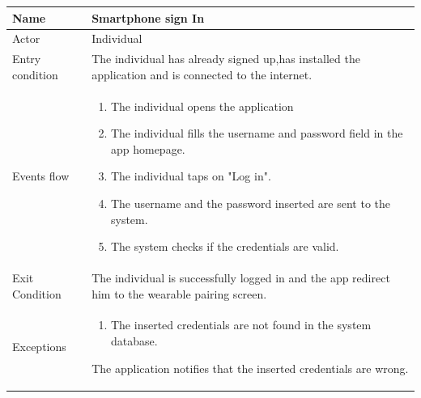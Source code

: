 \begin{tabular}{|l|p{11cm}|}
    \hline
    Name & Smartphone sign In
    \\ \hline
    Actor & Individual
    \\ \hline 
    Entry condition & The individual has already signed up,has installed the application and is connected to the internet.
    \\ \hline
    Events flow &
    \begin{enumerate}
    \item The individual opens the application
    \item The individual fills the username and password field in the app homepage.
    \item The individual taps on "Log in".
    \item The username and the password inserted are sent to the system.
    \item The system checks if the credentials are valid.
    \end{enumerate}
     \\ \hline
     Exit Condition & The individual is successfully logged in and the app redirect him to the wearable pairing screen.
     \\
    \hline
    Exceptions &
     \begin{enumerate}
    \item The inserted credentials are not found in the system database.  
    \end{enumerate}
   The application notifies that the inserted credentials are wrong.
      \\
    \hline
\end{tabular}

\givespace

